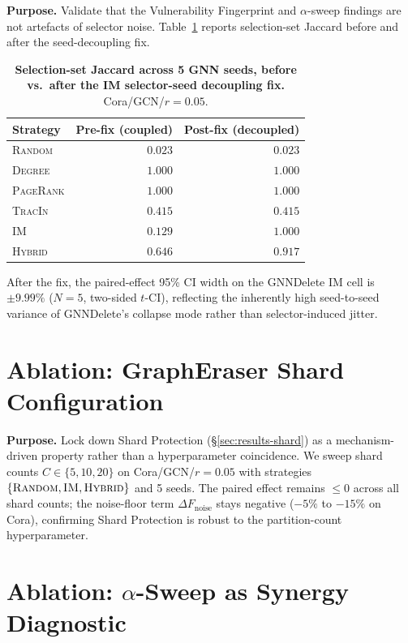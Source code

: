 \textbf{Purpose.} Validate that the Vulnerability Fingerprint and
$\alpha$-sweep findings are not artefacts of selector noise.
Table~\ref{tab:jaccard} reports selection-set Jaccard before and after
the seed-decoupling fix.

\begin{table}[h]
\centering
\small
\caption{\textbf{Selection-set Jaccard across 5 GNN seeds, before vs.\
after the IM selector-seed decoupling fix.} Cora/GCN/$r{=}0.05$.}
\label{tab:jaccard}
\begin{tabular}{@{}lrr@{}}
\toprule
Strategy & Pre-fix (coupled) & Post-fix (decoupled) \\
\midrule
\textsc{Random}    & $0.023$ & $0.023$ \\
\textsc{Degree}    & $1.000$ & $1.000$ \\
\textsc{PageRank}  & $1.000$ & $1.000$ \\
\textsc{TracIn}    & $0.415$ & $0.415$ \\
\textsc{IM}        & $0.129$ & $\mathbf{1.000}$ \\
\textsc{Hybrid}    & $0.646$ & $0.917$ \\
\bottomrule
\end{tabular}
\end{table}

After the fix, the paired-effect 95\% CI width on the GNNDelete IM
cell is $\pm 9.99\%$ ($N{=}5$, two-sided $t$-CI), reflecting the
inherently high seed-to-seed variance of GNNDelete's collapse mode
rather than selector-induced jitter.

\section{Ablation: GraphEraser Shard Configuration}
\label{app:shard}

\textbf{Purpose.} Lock down Shard Protection
(\S\ref{sec:results-shard}) as a mechanism-driven property rather than
a hyperparameter coincidence. We sweep shard counts
$C\in\{5,10,20\}$ on Cora/GCN/$r{=}0.05$ with strategies
$\{\textsc{Random},\textsc{IM},\textsc{Hybrid}\}$ and 5 seeds. The
paired effect remains ${\le}0$ across all shard counts; the
noise-floor term $\Delta F_{\text{noise}}$ stays negative
($-5\%$ to $-15\%$ on Cora), confirming Shard Protection is robust to
the partition-count hyperparameter.

\section{Ablation: \texorpdfstring{$\alpha$}{alpha}-Sweep as Synergy Diagnostic}
\label{app:alpha}

